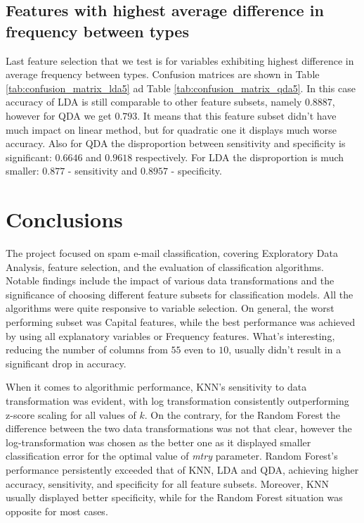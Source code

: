 \documentclass{article}\usepackage[]{graphicx}\usepackage[]{xcolor}
\begin{document}
\subsection*{Features with highest average difference in frequency between types}
	 
Last feature selection that we test is for variables exhibiting highest difference in 
average frequency between types. Confusion matrices are shown in Table 
\ref{tab:confusion_matrix_lda5} ad Table \ref{tab:confusion_matrix_qda5}.
In this case accuracy of LDA is still comparable to other feature subsets, namely 
$0.8887$, however for QDA we get $0.793$. It means that this feature subset didn't 
have much impact on linear method, but for quadratic one it displays much worse accuracy. 
Also for QDA the disproportion between sensitivity and specificity is significant: 
$0.6646$ and $0.9618$ respectively. For LDA the disproportion is much smaller: 
$0.877$ - sensitivity and $0.8957$ - specificity.


\section{Conclusions}

The project focused on spam e-mail classification, covering Exploratory Data Analysis, 
feature selection, and the evaluation of classification algorithms.
Notable findings include the impact of various data transformations and the 
significance of choosing different feature subsets for classification models.
All the algorithms were quite responsive to variable selection. On general, 
the worst performing subset was Capital features, while the best performance was
achieved by using all explanatory variables or Frequency features.
What's interesting, reducing the number of columns from $55$ even to $10$, usually
didn't result in a significant drop in accuracy. 

When it comes to algorithmic performance, KNN's sensitivity to data transformation 
was evident, with log transformation consistently outperforming z-score scaling for all values of $k$. 
On the contrary, for the Random Forest the difference between the two data transformations
was not that clear, however the log-transformation was chosen as the better one as it
displayed smaller classification error for the optimal value of \textit{mtry} parameter.
Random Forest's performance persistently exceeded that of KNN, LDA and QDA, achieving higher accuracy, 
sensitivity, and specificity for all feature subsets. Moreover, KNN usually displayed better specificity,
while for the Random Forest situation was opposite for most cases.
\end{document}
